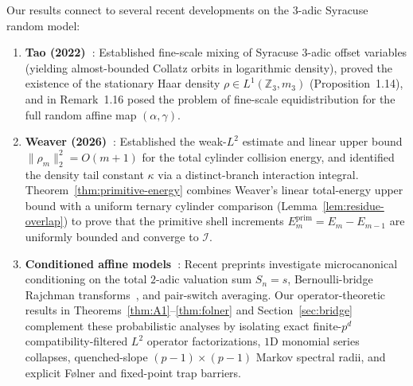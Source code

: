 \documentclass[11pt,a4paper]{article}
\numberwithin{equation}{section}
\theoremstyle{definition}
\theoremstyle{remark}
\newcommand{\Z}{\mathbb{Z}}
\newcommand{\cI}{\mathcal{I}}
\newcommand{\prim}{\mathrm{prim}}
\begin{document}
Our results connect to several recent developments on the $3$-adic Syracuse random model:
\begin{enumerate}[label=(\arabic*),topsep=3pt,itemsep=2pt]
\item \textbf{Tao (2022)~\cite{Tao2019}}: Established fine-scale mixing of Syracuse $3$-adic offset variables (yielding almost-bounded Collatz orbits in logarithmic density), proved the existence of the stationary Haar density $\rho \in L^1(\Z_3, m_3)$ (Proposition~1.14), and in Remark~1.16 posed the problem of fine-scale equidistribution for the full random affine map $(\alpha, \gamma)$.
\item \textbf{Weaver (2026)~\cite{Weaver2026,WeaverLocal2026}}: Established the weak-$L^2$ estimate and linear upper bound $\|\rho_m\|_2^2 = O(m+1)$ for the total cylinder collision energy, and identified the density tail constant $\kappa$ via a distinct-branch interaction integral. Theorem~\ref{thm:primitive-energy} combines Weaver's linear total-energy upper bound with a uniform ternary cylinder comparison (Lemma~\ref{lem:residue-overlap}) to prove that the primitive shell increments $E_m^{\prim} = E_m - E_{m-1}$ are uniformly bounded and converge to $\cI$.
\item \textbf{Conditioned affine models~\cite{YuanSi2026,Allikvere2026}}: Recent preprints investigate microcanonical conditioning on the total $2$-adic valuation sum $S_n = s$, Bernoulli-bridge Rajchman transforms~\cite{Bremont2021}, and pair-switch averaging. Our operator-theoretic results in Theorems~\ref{thm:A1}--\ref{thm:folner} and Section~\ref{sec:bridge} complement these probabilistic analyses by isolating exact finite-$p^d$ compatibility-filtered $L^2$ operator factorizations, $1$D monomial series collapses, quenched-slope $(p-1)\times(p-1)$ Markov spectral radii, and explicit F{\o}lner and fixed-point trap barriers.
\end{enumerate}
\end{document}
